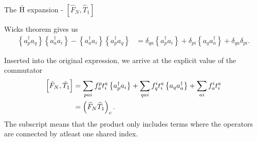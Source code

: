 \begin{frame}{The $\bar{\mathrm{H}}$ expansion - $\left[ \hat{F}_N, \hat{T}_1 \right]$}

        Wicks theorem gives us
        \begin{align*}
            \left\{a_p^\dagger a_q \right\}\left\{a_a^\dagger a_i\right\} - \left\{a_a^\dagger a_i\right\} \left\{a_p^\dagger a_q \right\} &= \delta_{qa} \left\{ a_p^\dagger a_i\right\} + \delta_{pi} \left\{ a_q a_a^\dagger \right\} + \delta_{qa}\delta_{pi}.
    \end{align*}

        Inserted into the original expression, we arrive at the explicit value of the commutator
        \begin{align*}
        \left[ \hat{F}_N, \hat{T}_1 \right] &= \sum_{pai} f_a^p t_i^a \left\{a_p^\dagger a_i\right\} + 
                \sum_{qai} f_q^i t_i^a \left\{a_q a_a^\dagger\right\} + \sum_{ai} f_a^i t_i^a \\
            &= \left( \widehat{F}_N \widehat{T}_1 \right)_c.
        \end{align*}
    The subscript means that the product only includes terms where the operators are connected by atleast one shared index.

\end{frame}

    
